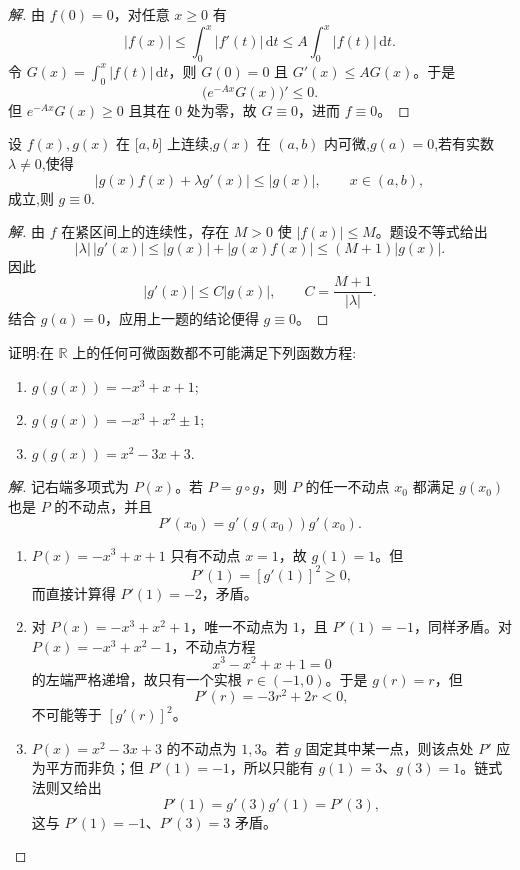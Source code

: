 \documentclass[../../数学分析培优讲义(答案版).tex]{subfiles}
\begin{document}
\begin{proof}[解]
由 $f(0)=0$，对任意 $x\geq0$ 有
\[
    |f(x)|\leq\int_0^x|f'(t)|\,\mathrm{d}t
    \leq A\int_0^x|f(t)|\,\mathrm{d}t.
\]
令 $G(x)=\displaystyle\int_0^x|f(t)|\,\mathrm{d}t$，则 $G(0)=0$ 且 $G'(x)\leq AG(x)$。于是
\[
    \bigl(e^{-Ax}G(x)\bigr)'\leq0.
\]
但 $e^{-Ax}G(x)\geq0$ 且其在 $0$ 处为零，故 $G\equiv0$，进而 $f\equiv0$。
\end{proof}

\begin{example}
设 $f(x),g(x)$ 在 $\lbrack a,b\rbrack$ 上连续,$g(x)$ 在 $(a,b)$ 内可微,$g(a)=0$,若有实数 $\lambda\neq0$,使得
\[
    |g(x)f(x)+\lambda g'(x)|\leq|g(x)|,
    \qquad x\in(a,b),
\]
成立,则 $g\equiv0$.
\end{example}

\begin{proof}[解]
由 $f$ 在紧区间上的连续性，存在 $M>0$ 使 $|f(x)|\leq M$。题设不等式给出
\[
    |\lambda|\,|g'(x)|
    \leq |g(x)|+|g(x)f(x)|
    \leq(M+1)|g(x)|.
\]
因此
\[
    |g'(x)|\leq C|g(x)|,
    \qquad C=\dfrac{M+1}{|\lambda|}.
\]
结合 $g(a)=0$，应用上一题的结论便得 $g\equiv0$。
\end{proof}

\begin{example}
证明:在 $\mathbb{R}$ 上的任何可微函数都不可能满足下列函数方程:
\begin{enumerate}[label=(\arabic*)]
    \item $g(g(x))=-x^3+x+1$;
    \item $g(g(x))=-x^3+x^2\pm1$;
    \item $g(g(x))=x^2-3x+3$.
\end{enumerate}
\end{example}

\begin{proof}[解]
记右端多项式为 $P(x)$。若 $P=g\circ g$，则 $P$ 的任一不动点 $x_0$ 都满足 $g(x_0)$ 也是 $P$ 的不动点，并且
\[
    P'(x_0)=g'(g(x_0))g'(x_0).
\]

\begin{enumerate}[label=(\arabic*)]
    \item $P(x)=-x^3+x+1$ 只有不动点 $x=1$，故 $g(1)=1$。但
    \[
        P'(1)=[g'(1)]^2\geq0,
    \]
    而直接计算得 $P'(1)=-2$，矛盾。

    \item 对 $P(x)=-x^3+x^2+1$，唯一不动点为 $1$，且 $P'(1)=-1$，同样矛盾。对 $P(x)=-x^3+x^2-1$，不动点方程
    \[
        x^3-x^2+x+1=0
    \]
    的左端严格递增，故只有一个实根 $r\in(-1,0)$。于是 $g(r)=r$，但
    \[
        P'(r)=-3r^2+2r<0,
    \]
    不可能等于 $[g'(r)]^2$。

    \item $P(x)=x^2-3x+3$ 的不动点为 $1,3$。若 $g$ 固定其中某一点，则该点处 $P'$ 应为平方而非负；但 $P'(1)=-1$，所以只能有 $g(1)=3$、$g(3)=1$。链式法则又给出
    \[
        P'(1)=g'(3)g'(1)=P'(3),
    \]
    这与 $P'(1)=-1$、$P'(3)=3$ 矛盾。
\end{enumerate}
\end{proof}
\end{document}
